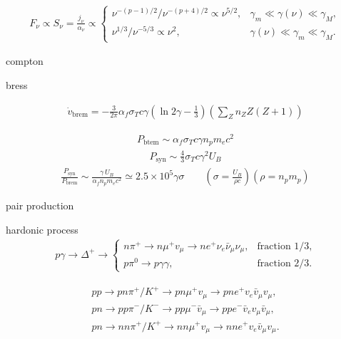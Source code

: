 \documentclass{article}
\begin{document}
\begin{align*}
    F_\nu \propto S_\nu = \frac{j_\nu}{\alpha_\nu} \propto \begin{cases}
                                                       \nu^{-(p-1)/2}/\nu^{-(p+4)/2} \propto \nu^{5/2}, & \gamma_m \ll \gamma(\nu) \ll \gamma_M, \\
                                                       \nu^{1/3}/\nu^{-5/3} \propto \nu^2,              & \gamma(\nu) \ll \gamma_m \ll \gamma_M.
                                                   \end{cases}
\end{align*}

compton



bress

\begin{align*}
    \dot{v}_{\text{brem}} = -\frac{3}{2\pi} \alpha_f \sigma_T c \gamma \left( \ln 2\gamma - \frac{1}{3} \right) \left( \sum_Z n_Z Z(Z + 1) \right)
\end{align*}

\begin{align*}
    P_{\text{btem}} \sim \alpha_f \sigma_T c \gamma n_p m_e c^2
\end{align*}
\begin{align*}
    P_{\text{syn}} \sim \frac{4}{3} \sigma_T c \gamma^2 U_B
\end{align*}
\begin{align*}
    \frac{P_{\text{syn}}}{P_{\text{brem}}} \sim \frac{\gamma \, U_B}{\alpha_f n_p m_e c^2} \simeq 2.5 \times 10^5 \gamma \sigma \qquad (\sigma=\frac{U_B}{\rho c}) (\rho = n_p m_p)
\end{align*}

pair production



hardonic process
\begin{align*}
    p \gamma \to \Delta^+ \to \begin{cases}
                                  n \pi^{+} \to n \mu^{+} v_\mu \to n e^{+} \nu_e \bar{\nu}_\mu \nu_\mu, & \text{fraction 1/3}, \\
                                  p \pi^0 \to p \gamma \gamma,                                           & \text{fraction 2/3}.
                              \end{cases}
\end{align*}

\begin{align*}
    pp \to pn\pi^+/K^+ \to pn\mu^+ v_\mu \to pne^+ v_e \bar{v}_\mu v_\mu,             \\
    pn \to pp\pi^-/K^- \to pp\mu^- \bar{v}_\mu \to ppe^- \bar{v}_e v_\mu \bar{v}_\mu, \\
    pn \to nn\pi^+/K^+ \to nn\mu^+ v_\mu \to nne^+ v_e \bar{v}_\mu v_\mu.
\end{align*}
\end{document}
